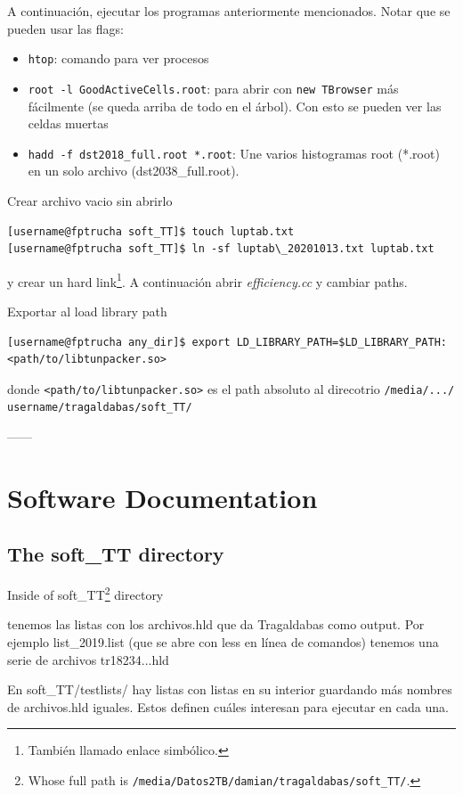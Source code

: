 \documentclass[a4paper]{book}
\begin{document}
A continuación, ejecutar los programas anteriormente mencionados. Notar que se pueden usar las flags:
\begin{itemize}
	\item \texttt{htop}: comando para ver procesos
	\item \texttt{root -l GoodActiveCells.root}: para abrir con \texttt{new TBrowser} más fácilmente (se queda arriba de todo en el árbol). Con esto se pueden ver las celdas muertas
	\item \texttt{hadd -f dst2018\_full.root *.root}: Une varios histogramas root (*.root) en un solo archivo (dst2038\_full.root).
\end{itemize}


Crear archivo vacio sin abrirlo
\begin{lstlisting}[style=customsh]
[username@fptrucha soft_TT]$ touch luptab.txt
[username@fptrucha soft_TT]$ ln -sf luptab\_20201013.txt luptab.txt
\end{lstlisting}
y crear un hard link\footnote{También llamado enlace simbólico.}. A continuación abrir \textit{efficiency.cc} y cambiar paths.

Exportar al load library path
\begin{lstlisting}[style=customsh]
[username@fptrucha any_dir]$ export LD_LIBRARY_PATH=$LD_LIBRARY_PATH:<path/to/libtunpacker.so>
\end{lstlisting}
donde \texttt{<path/to/libtunpacker.so>} es el path absoluto al direcotrio \texttt{/media/.../ username/tragaldabas/soft\_TT/}


------



\chapter{Software Documentation}



\section{The soft\_TT directory}

Inside of soft\_TT\footnote{Whose full path is \texttt{/media/Datos2TB/damian/tragaldabas/soft\_TT/}.} directory

tenemos las listas con los archivos.hld que da Tragaldabas como output. Por ejemplo list\_2019.list (que se abre con less en línea de comandos) tenemos una serie de archivos tr18234...hld

En soft\_TT/testlists/ hay listas con listas en su interior guardando más nombres de archivos.hld iguales. Estos definen cuáles interesan para ejecutar en cada una.
\end{document}
